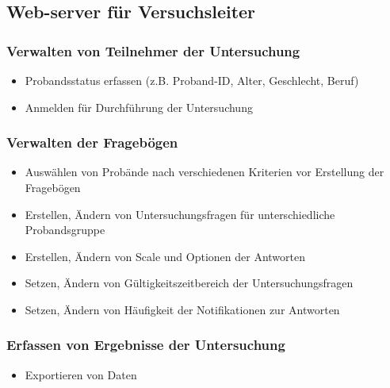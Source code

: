 \documentclass[a4paper]{scrreprt}
\begin{document}
            \subsection{Web-server f\"ur Versuchsleiter}
                \vspace*{0.2cm}

                \subsubsection{Verwalten von Teilnehmer der Untersuchung}
                    \begin{itemize}
                        \item Probandsstatus erfassen (z.B. Proband-ID, Alter, Geschlecht, Beruf)
                        \item Anmelden f\"ur Durchf\"uhrung der Untersuchung
                    \end{itemize}
            
                \subsubsection{Verwalten der Frageb\"ogen}
                    \begin{itemize}
                        \item Ausw\"ahlen von Prob\"ande nach verschiedenen Kriterien vor Erstellung der Frageb\"ogen
                        \item Erstellen, \"Andern von Untersuchungsfragen f\"ur unterschiedliche Probandsgruppe
                        \item Erstellen, \"Andern von Scale und Optionen der Antworten
                        \item Setzen, \"Andern von G\"ultigkeitszeitbereich der Untersuchungsfragen
                        \item Setzen, \"Andern von H\"aufigkeit der Notifikationen zur Antworten
                    \end{itemize}

                \subsubsection{Erfassen von Ergebnisse der Untersuchung}
                    \begin{itemize}
                        \item Exportieren von Daten  
                    \end{itemize}
            \vspace*{2cm}
\end{document}
